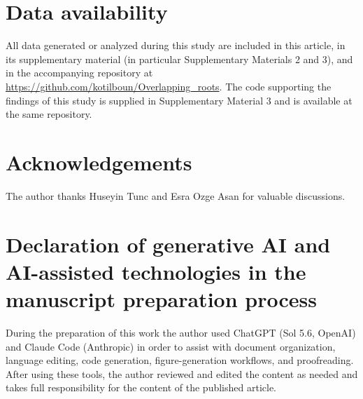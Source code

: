 \documentclass[review,12pt]{elsarticle}
\numberwithin{equation}{section}
\theoremstyle{remark}
\begin{document}
\section*{Data availability}

All data generated or analyzed during this study are included in this article,
in its supplementary material (in particular Supplementary Materials 2 and 3),
and in the accompanying repository at
\url{https://github.com/kotilboun/Overlapping_roots}. The code supporting the
findings of this study is supplied in Supplementary Material 3 and is available
at the same repository.

\section*{Acknowledgements}

The author thanks Huseyin Tunc and Esra Ozge Asan for valuable discussions.

\section*{Declaration of generative AI and AI-assisted technologies in the manuscript preparation process}

During the preparation of this work the author used ChatGPT (Sol 5.6, OpenAI)
and Claude Code (Anthropic) in order to assist with document organization,
language editing, code generation, figure-generation workflows, and
proofreading. After using these tools, the author reviewed and edited the
content as needed and takes full responsibility for the content of the
published article.



\end{document}
